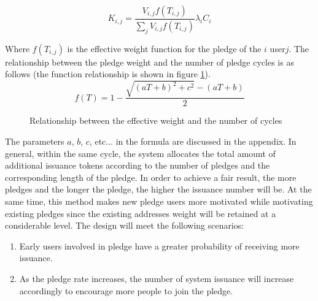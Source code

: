 \begin{equation}
  K_{i,j} = \frac{V_{i,j} f(T_{i,j})}{\sum_j V_{i,j} f(T_{i,j})} \lambda_i C_i
\end{equation}

Where \(f(T_{i,j})\) is the effective weight function for the pledge of the \(i\) user\(j\). The relationship between the pledge weight and the number of pledge cycles is as follows (the function relationship is shown in figure \ref{weight}).
\begin{equation}
  f(T) = 1 - \frac{\sqrt{(aT+b)^2+c^2}-(aT+b)}{2}
\end{equation}

\begin{figure}[h]
\centering
\caption{Relationship between the effective weight and the number of cycles}\label{weight}
\end{figure}

The parameters $a$, $b$, $c$, etc... in the formula are discussed in the appendix. In general, within the same cycle, the system allocates the total amount of additional issuance tokens according to the number of pledges and the corresponding length of the pledge. In order to achieve a fair result, the more pledges and the longer the pledge, the higher the issuance number will be. At the same time, this method makes new pledge users more motivated while motivating existing pledges since the existing addresses weight will be retained at a considerable level. The design will meet the following scenarios:

\begin{enumerate}[\hspace{1cm}(a)]
  \item Early users involved in pledge have a greater probability of receiving more issuance.
  \item As the pledge rate increases, the number of system issuance will increase accordingly to encourage more people to join the pledge.
\end{enumerate}

